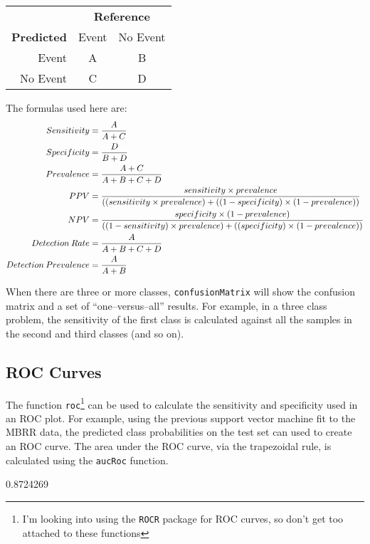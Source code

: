 \documentclass[12pt]{article}
\begin{document}
\begin{tabular}{r|c|c|}
                    & \multicolumn{2}{c}{{\bf Reference}}          \\
\cline{2-3}
         {\bf Predicted}  & Event     & No Event \\
\cline{2-3}
         Event      & A         & B        \\
\cline{2-3}
         No Event   & C         & D      \\
\cline{2-3}  
\end{tabular}

The formulas used here are:
\begin{align}
Sensitivity &= \frac{A}{A+C}\notag \\
Specificity &= \frac{D}{B+D}\notag \\
Prevalence &= \frac{A+C}{A+B+C+D}\notag \\
PPV &= \frac{sensitivity \times prevalence}{((sensitivity \times prevalence) + ((1-specificity) \times(1-prevalence))}\notag \\
NPV &= \frac{specificity \times (1-prevalence)}{((1-sensitivity) \times prevalence) + ((specificity) \times(1-prevalence))}\notag \\
Detection\: Rate &=  \frac{A}{A+B+C+D}\notag \\
Detection\: Prevalence &=  \frac{A}{A+B}\notag 
\end{align}

When there are three or more classes, \texttt{confusionMatrix} will show the confusion matrix and a set of ``one--versus--all'' results. For example, in a three class problem, the sensitivity of the first class is calculated against all the samples in the second and third classes (and so on).


\subsection*{ROC Curves}

The function \texttt{roc}\footnote{I'm looking into using the \texttt{ROCR} package for ROC curves, so don't get too attached to these functions} can be used to calculate the sensitivity and specificity used in an ROC plot. For example, using the previous support vector machine fit to the MBRR data, the predicted class probabilities on the test set can used to create an ROC curve. The area under the ROC curve, via the trapezoidal rule, is calculated using the \texttt{aucRoc} function. 

\begin{small}
\begin{Schunk}
\begin{Soutput}
[1] 0.8724269
\end{Soutput}
\end{Schunk}
\end{small}
\end{document}
